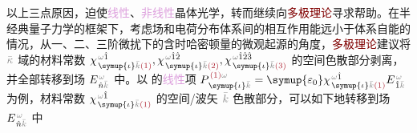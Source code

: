 以上三点原因，迫使\textcolor{Plum}{线性}、\textcolor{Plum}{非线性}\textcolor{PineGreen}{晶体光学}，转而继续向\textcolor{Maroon}{多极理论}寻求帮助。在半经典\textcolor{NavyBlue}{量子力学}的框架下，考虑场和电荷分布体系间的相互作用能远小于体系自能的情况，从一、二、三阶\textcolor{NavyBlue}{微扰}下的含时\textcolor{NavyBlue}{哈密顿量}的\textcolor{NavyBlue}{微观起源}的角度，\textcolor{Maroon}{多极理论}建议将 $\mathcolor{gray}{\bar{\kappa}}$ 域的材料常数 $\chi^{\;\! \mathcolor{gray}{\omega} \hat{1}}_{\;\! \symup{\iota} \mathcolor{gray}{\bar{k}} \textcolor{Maroon}{(1)}}, \chi^{\;\! \mathcolor{gray}{\omega} \hat{1} \hat{2}}_{\;\! \symup{\iota} \mathcolor{gray}{\bar{k}} \textcolor{Maroon}{(2)}}, \chi^{\;\! \mathcolor{gray}{\omega} \hat{1} \hat{2} \hat{3}}_{\;\! \symup{\iota} \mathcolor{gray}{\bar{k}} \textcolor{Maroon}{(3)}}$ 的空间\textcolor{NavyBlue}{色散}部分剥离，并全部转移到场 $E^{\;\!\mathcolor{gray}{\omega}}_{\;\! \hat{n} \mathcolor{gray}{\bar{k}}}$ 中。以  的\textcolor{Plum}{线性}项 $P^{\;\! \textcolor{Maroon}{(1)} \mathcolor{gray}{\omega}}_{\;\! \symup{\iota}\mathcolor{gray}{\bar{k}}} = {\symup{\varepsilon_0}} \chi^{\;\! \mathcolor{gray}{\omega} \hat{1}}_{\;\! \symup{\iota} \mathcolor{gray}{\bar{k}} \textcolor{Maroon}{(1)}} E^{\;\!\mathcolor{gray}{\omega}}_{\;\! \hat{1} \mathcolor{gray}{\bar{k}}}$ 为例，材料常数 $\chi^{\;\! \mathcolor{gray}{\omega} \hat{1}}_{\;\! \symup{\iota} \mathcolor{gray}{\bar{k}} \textcolor{Maroon}{(1)}}$ 的空间/\textcolor{PineGreen}{波矢} $\mathcolor{gray}{\bar{k}}$ \textcolor{NavyBlue}{色散}部分，可以如下地转移到场 $E^{\;\!\mathcolor{gray}{\omega}}_{\;\! \hat{n} \mathcolor{gray}{\bar{k}}}$ 中
